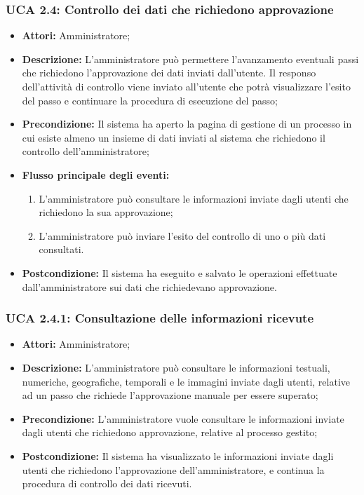 \hypertarget{A2.4}{}
\subsubsection{UCA 2.4: Controllo dei dati che richiedono approvazione}
\begin{itemize}
\item \textbf{Attori:}
 Amministratore;
\item \textbf{Descrizione:} 
L'amministratore può permettere l'avanzamento eventuali passi che richiedono l'approvazione dei dati inviati dall'utente.
Il responso dell'attività di controllo viene inviato all'utente che potrà visualizzare l'esito del passo e continuare la procedura di esecuzione del passo;
\item \textbf{Precondizione:} 
Il sistema ha aperto la pagina di gestione di un processo in cui esiste almeno un insieme di dati inviati al sistema che richiedono il controllo dell'amministratore;
\item \textbf{Flusso principale degli eventi:} 
\begin{enumerate}
\item L'amministratore può consultare le informazioni inviate dagli utenti che richiedono la sua approvazione;
\item L'amministratore può inviare l'esito del controllo di uno o più dati consultati.
\end{enumerate}
\item \textbf{Postcondizione:} 
Il sistema ha eseguito e salvato le operazioni effettuate dall'amministratore sui dati che richiedevano approvazione.
\end{itemize}

\hypertarget{A2.4.1}{}
\subsubsection{UCA 2.4.1: Consultazione delle informazioni ricevute}
\begin{itemize}
\item \textbf{Attori:}
 Amministratore;
\item \textbf{Descrizione:} 
L'amministratore può consultare le informazioni testuali, numeriche, geografiche, temporali e le immagini inviate dagli utenti, relative ad un passo che richiede l'approvazione manuale per essere superato; 
\item \textbf{Precondizione:} 
L'amministratore vuole consultare le informazioni inviate dagli utenti che richiedono approvazione, relative al processo gestito;
\item \textbf{Postcondizione:} 
Il sistema ha visualizzato le informazioni inviate dagli utenti che richiedono l'approvazione dell'amministratore, e continua la procedura di controllo dei dati ricevuti.
\end{itemize}

